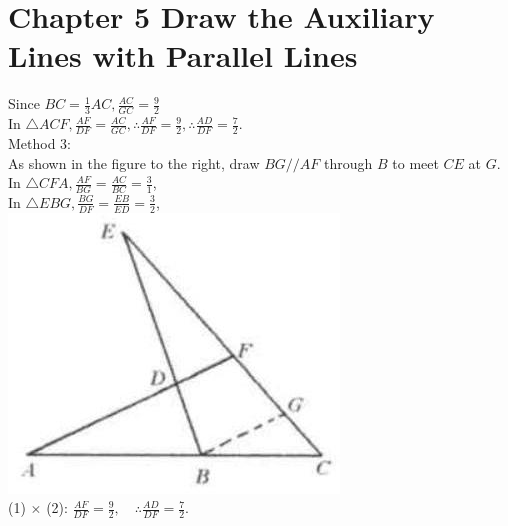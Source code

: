 \documentclass[10pt]{article}
\begin{document}
\section*{Chapter 5 Draw the Auxiliary Lines with Parallel Lines}
Since \(B C=\frac{1}{3} A C, \frac{A C}{G C}=\frac{9}{2}\)\\
In \(\triangle A C F, \frac{A F}{D F}=\frac{A C}{G C}, \therefore \frac{A F}{D F}=\frac{9}{2}, \therefore \frac{A D}{D F}=\frac{7}{2}\).\\
Method 3:\\
As shown in the figure to the right, draw \(B G / / A F\) through \(B\) to meet \(C E\) at \(G\).\\
In \(\triangle C F A, \frac{A F}{B G}=\frac{A C}{B C}=\frac{3}{1}\),\\
In \(\triangle E B G, \frac{B G}{D F}=\frac{E B}{E D}=\frac{3}{2}\),\\
\includegraphics[max width=\textwidth, center]{2025_04_17_97bc1f7e44d93c271a88g-112(1)}\\
(1) \(\times\) (2): \(\frac{A F}{D F}=\frac{9}{2}, \quad \therefore \frac{A D}{D F}=\frac{7}{2}\).
\end{document}
